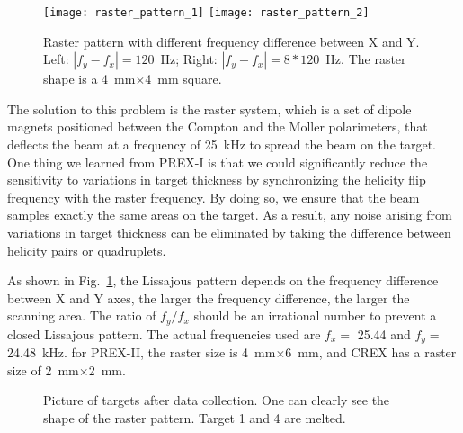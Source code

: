 \begin{figure}[!h]
    \centering
    \texttt{[image: raster\_pattern\_1]}
    \texttt{[image: raster\_pattern\_2]}
    \caption[Raster pattern]
    {Raster pattern with different frequency difference between X and Y.
    Left: $|f_y - f_x| = 120$~Hz; Right: $|f_y - f_x| = 8*120$~Hz. The raster
    shape is a 4~mm$\times$4~mm square.} 
    \label{fig:raster_pattern}
\end{figure}

The solution to this problem is the raster system, which is a set of dipole magnets %
positioned between the Compton and the Moller polarimeters,
that deflects the beam at a frequency of 25~kHz to spread the beam on the target.
One thing we learned from PREX-I is that we could significantly reduce the sensitivity 
to variations in target thickness by synchronizing the helicity flip frequency
with the raster frequency. By doing so, we ensure that the beam samples exactly 
the same areas on the target. As a result, any noise arising from variations in 
target thickness can be eliminated by taking the difference between
helicity pairs or quadruplets. 

As shown in Fig.~\ref{fig:raster_pattern}, the Lissajous pattern depends
on the frequency difference between X and Y axes, the larger the frequency difference,
the larger the scanning area. The ratio of $f_y/f_x$ should be an irrational number
to prevent a closed Lissajous pattern. The actual frequencies used are $f_x =$ 25.44
and $f_y =$ 24.48~kHz. for PREX-II, the raster size is 4~mm$\times$6~mm, and CREX
has a raster size of 2~mm$\times$2~mm.

\begin{figure}
    \caption{Picture of \Pb targets after data collection. One can clearly see the shape
    of the raster pattern. Target 1 and 4 are melted.}
\end{figure}

